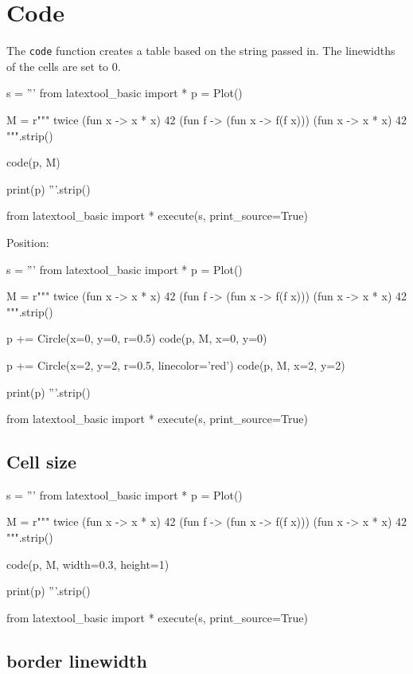 \section{Code}

The \verb!code! function creates a table based on the string passed in.
The linewidths of the cells are set to 0.

\begin{python}
s = '''
from latextool_basic import *
p = Plot()

M = r"""
twice (fun x -> x * x) 42
(fun f -> (fun x -> f(f x))) (fun x -> x * x) 42
""".strip()
    
code(p, M)

print(p)
'''.strip()

from latextool_basic import *
execute(s, print_source=True)
\end{python}

\newpage
Position:
\begin{python}
s = '''
from latextool_basic import *
p = Plot()

M = r"""
twice (fun x -> x * x) 42
(fun f -> (fun x -> f(f x))) (fun x -> x * x) 42
""".strip()

p += Circle(x=0, y=0, r=0.5)
code(p, M, x=0, y=0)

p += Circle(x=2, y=2, r=0.5, linecolor='red')
code(p, M, x=2, y=2)

print(p)
'''.strip()

from latextool_basic import *
execute(s, print_source=True)
\end{python}



\newpage
\subsection{Cell size}
\begin{python}
s = '''
from latextool_basic import *
p = Plot()

M = r"""
twice (fun x -> x * x) 42
(fun f -> (fun x -> f(f x))) (fun x -> x * x) 42
""".strip()
    
code(p, M, width=0.3, height=1)

print(p)
'''.strip()

from latextool_basic import *
execute(s, print_source=True)
\end{python}




\newpage
\subsection{border linewidth}


